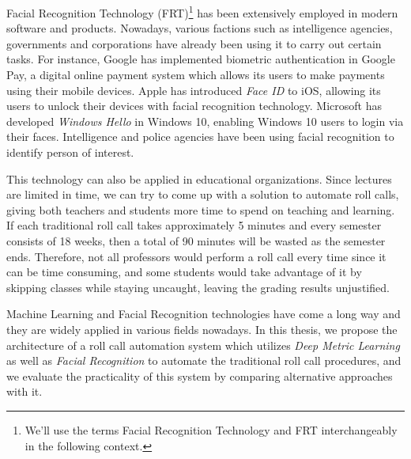 Facial Recognition Technology (FRT)\footnote{We'll use the terms Facial Recognition Technology and FRT interchangeably in the following context.}
has been extensively employed in modern software and products. Nowadays, various factions such as intelligence agencies, governments
and corporations have already been using it to carry out certain tasks. For instance, Google has implemented biometric authentication
in Google Pay, a digital online payment system which allows its users to make payments using their mobile devices.
Apple has introduced \emph{Face ID} to iOS, allowing its users to unlock their devices with facial recognition technology.
Microsoft has developed \emph{Windows Hello} in Windows 10, enabling Windows 10 users to login via their faces.
Intelligence and police agencies have been using facial recognition to identify person of interest.
\vspace{0.3cm}

This technology can also be applied in educational organizations. Since lectures are limited in time, we can try to come up
with a solution to automate roll calls, giving both teachers and students more time to spend on teaching and learning.
If each traditional roll call takes approximately 5 minutes and every semester consists of 18 weeks, then a total of 90 minutes
will be wasted as the semester ends. Therefore, not all professors would perform a roll call every time since it can be time consuming,
and some students would take advantage of it by skipping classes while staying uncaught, leaving the grading results unjustified.
\vspace{0.3cm}

Machine Learning and Facial Recognition technologies have come a long way and they are widely applied in various fields nowadays.
In this thesis, we propose the architecture of a roll call automation system which utilizes \emph{Deep Metric Learning} as well as
\emph{Facial Recognition} to automate the traditional roll call procedures, and we evaluate the practicality of this system 
by comparing alternative approaches with it.




